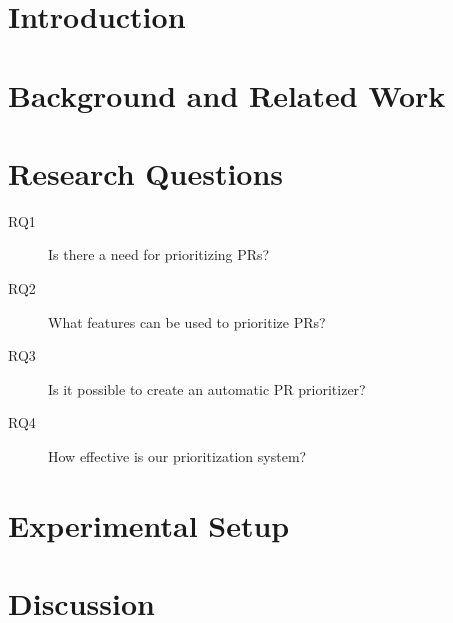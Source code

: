 \documentclass[conference]{IEEEtran}
\begin{document}
\maketitle

\begin{abstract}

\end{abstract}




\section{Introduction}

\section{Background and Related Work}

\section{Research Questions}

\begin{description}
  \item[RQ1] Is there a need for prioritizing PRs?
  \item[RQ2] What features can be used to prioritize PRs?
  \item[RQ3] Is it possible to create an automatic PR prioritizer?
  \item[RQ4] How effective is our prioritization system?
\end{description}







\section{Experimental Setup}



\section{Discussion}









\end{document}
